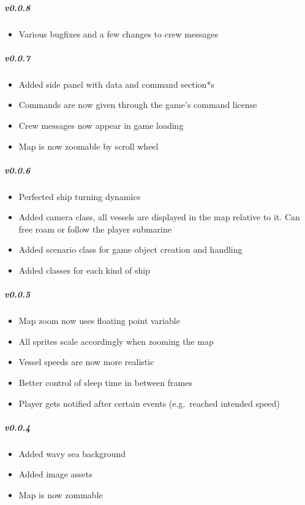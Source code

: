 \subparagraph{v0.0.8}

\begin{itemize}[noitemsep]
\item
  Various bugfixes and a few changes to crew messages
\end{itemize}

\subparagraph{v0.0.7}

\begin{itemize}[noitemsep]
\item
  Added side panel with data and command section*s
\item
  Commands are now given through the game's command license
\item
  Crew messages now appear in game loading
\item
  Map is now zoomable by scroll wheel
\end{itemize}

\subparagraph{v0.0.6}

\begin{itemize}[noitemsep]
\item
  Perfected ship turning dynamics
\item
  Added camera class, all vessels are displayed in the map relative to
  it. Can free roam or follow the player submarine
\item
  Added scenario class for game object creation and handling
\item
  Added classes for each kind of ship
\end{itemize}

\subparagraph{v0.0.5}

\begin{itemize}[noitemsep]
\item
  Map zoom now uses floating point variable
\item
  All sprites scale accordingly when zooming the map
\item
  Vessel speeds are now more realistic
\item
  Better control of sleep time in between frames
\item
  Player gets notified after certain events (e.g.~reached intended
  speed)
\end{itemize}

\subparagraph{v0.0.4}

\begin{itemize}[noitemsep]
\item
  Added wavy sea background
\item
  Added image assets
\item
  Map is now zommable
\end{itemize}

